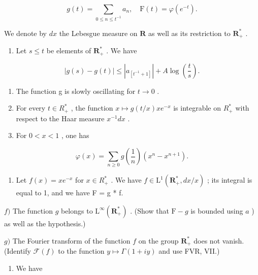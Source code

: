\[
g (t) = \sum_ {0 \leqslant n \leqslant t ^ {- 1}} a _ {n}, \quad \mathrm{F} (t) = \varphi (e ^ {- t}).
\]

We denote by \(dx\) the Lebesgue measure on \(\mathbf{R}\) as well as its restriction to \(\mathbf{R}_{+}^{*}\) .

\begin{enumerate}
\def\labelenumi{\alph{enumi})}
\tightlist
\item
  Let \(s \leqslant t\) be elements of \(\mathbf{R}_{+}^{*}\) . We have
\end{enumerate}

\[
| g (s) - g (t) | \leqslant | a _ {[ t ^ {- 1} + 1 ]} | + A \log \left(\frac {t}{s}\right).
\]

\begin{enumerate}
\def\labelenumi{\alph{enumi})}
\setcounter{enumi}{1}
\item
  The function g is slowly oscillating for \(t \rightarrow 0\) .
\item
  For every \(t \in R_{+}^{*}\) , the function \(x \mapsto g(t/x)xe^{-x}\) is integrable on \(R_{+}^{*}\) with respect to the Haar measure \(x^{-1}dx\) .
\item
  For \(0 < x < 1\) , one has
\end{enumerate}

\[
\varphi (x) = \sum_ {n \geqslant 0} g \left(\frac {1}{n}\right) \left(x ^ {n} - x ^ {n + 1}\right).
\]

\begin{enumerate}
\def\labelenumi{\alph{enumi})}
\setcounter{enumi}{4}
\tightlist
\item
  Let \(f(x) = xe^{-x}\) for \(x \in R_{+}^{*}\) . We have \(f \in \mathrm{L}^{1}(\mathbf{R}_{+}^{*}, dx/x)\) ; its integral is equal to 1, and we have F = g * f.
\end{enumerate}

\(f)\) The function \(g\) belongs to \(\mathrm{L}^{\infty}(\mathbf{R}_{+}^{*})\) . (Show that \(\mathrm{F}-g\) is bounded using \(a\) ) as well as the hypothesis.)

\(g)\) The Fourier transform of the function \(f\) on the group \(\mathbf{R}_{+}^{*}\) does not vanish. (Identify \(\mathcal{F}(f)\) to the function \(y\mapsto\Gamma(1+iy)\) and use FVR, VII.)

\begin{enumerate}
\def\labelenumi{\alph{enumi})}
\setcounter{enumi}{7}
\tightlist
\item
  We have
\end{enumerate}

